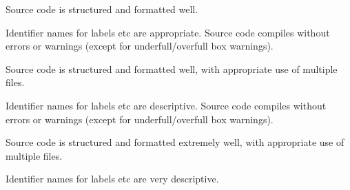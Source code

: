 \documentclass{../../../fal_assignment}
\begin{document}
\begin{markingrubric}
			\par Source code is structured and formatted well.
			\par Identifier names for labels etc are appropriate.
		\grade Source code compiles without errors or warnings (except for underfull/overfull box warnings).
			\par Source code is structured and formatted well, with appropriate use of multiple files.
			\par Identifier names for labels etc are descriptive.
		\grade Source code compiles without errors or warnings (except for underfull/overfull box warnings).
			\par Source code is structured and formatted extremely well, with appropriate use of multiple files.
			\par Identifier names for labels etc are very descriptive.
\end{markingrubric}
\end{document}
